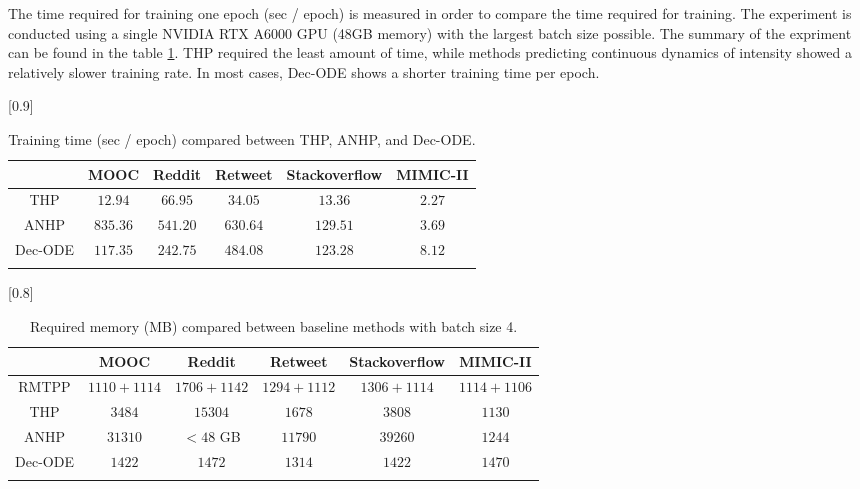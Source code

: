 The time required for training one epoch (sec / epoch) is measured in order to compare the time required for training. 
The experiment is conducted using a single NVIDIA RTX A6000 GPU (48GB memory) with the largest batch size possible. 
The summary of the expriment can be found in the table \ref{tab:epoch_time}. 
THP required the least amount of time, while methods predicting continuous dynamics of intensity showed a relatively slower training rate. 
In most cases, Dec-ODE shows a shorter training time per epoch.
\begin{table}[h]
    \renewcommand{\arraystretch}{1.1}
    \centering
    \caption{Training time (sec / epoch) compared between THP, ANHP, and Dec-ODE.}
    \scalebox{0.9}[0.9]{
    \begin{tabular}{c| c| c | c | c | c } \Xhline{0.3ex}
    & \multicolumn{1}{c|}{MOOC} & \multicolumn{1}{c|}{Reddit} & \multicolumn{1}{c|}{Retweet} & \multicolumn{1}{c|}{Stackoverflow} & \multicolumn{1}{c}{MIMIC-II}\\[-2pt]
    \hline
    THP & $12.94$ & $66.95$ & $34.05$ & $13.36$ & $2.27$ \\
    ANHP & $835.36$ & $541.20$ & $630.64$ &$129.51$ & $3.69$ \\
    Dec-ODE & $117.35$ & $242.75$ & $484.08$ & $123.28$ & $8.12$\\
        
    \Xhline{0.3ex}      
    \end{tabular}
    }
        \label{tab:epoch_time}
    
    \end{table}
    
    \begin{table}[h]
    \renewcommand{\arraystretch}{1.1}
    \centering
    \caption{Required memory (MB) compared between baseline methods with batch size 4.}
    
    \scalebox{0.8}[0.8]{
    \begin{tabular}{c| c| c | c | c | c } \Xhline{0.3ex}
    & \multicolumn{1}{c|}{MOOC} & \multicolumn{1}{c|}{Reddit} & \multicolumn{1}{c|}{Retweet} & \multicolumn{1}{c|}{Stackoverflow} & \multicolumn{1}{c}{MIMIC-II}\\[-2pt]
    \hline
    RMTPP & $1110 + 1114$ & $1706 + 1142$ & $1294 + 1112$ & $1306 + 1114$ & $1114 + 1106$ \\
    THP & $3484$ & $15304$ & $1678$ & $3808$ & $1130$ \\
    ANHP & $31310$ & $< 48$ GB & $11790$ &$39260$ & $1244$ \\
    Dec-ODE & $1422$ & $1472$ & $1314$ & $1422$ & $1470$\\
    \Xhline{0.3ex}      
    \end{tabular}
    }
        \label{tab:epoch_memory}
    \end{table}
